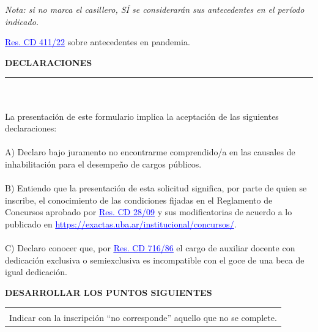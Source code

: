 \documentclass{article}
\newcommand{\titulosec}[1]{\textbf{\textsf{\MakeUppercase{#1}}}}
\newcommand{\seccion}[1]{
    \bigskip
    \noindent \titulosec{#1} \\
    \noindent\rule{\textwidth}{1pt}
  }
\newcommand{\recuadro}[1]{
    \begin{center}
    \begin{tabular}{|m{0.9\textwidth}|}
        \hline
        \begin{center}
        \textsf{\textbf{#1}}
        \end{center}
        \\
        \hline
    \end{tabular}
    \end{center}
  }
\newcommand{\enlace}[2]{\href{#1}{\textcolor{blue}{\underline{#2}}}}
\begin{document}
  \noindent \textit{Nota: si no marca el casillero, SÍ se considerarán sus antecedentes en el período indicado.}

  \noindent \enlace{https://exactas.uba.ar/wp-content/uploads/2022/04/CD-22-0411-MODIFICACION-REGLAMENTO.pdf}{Res. CD 411/22} sobre antecedentes en pandemia.

  \seccion{Declaraciones}

  \newpage

  \noindent \hrulefill
  \\\\
  \noindent La presentación de este formulario implica la aceptación de las siguientes declaraciones:
  \\\\
  \noindent A) Declaro bajo juramento no encontrarme comprendido/a en las causales de inhabilitación para el desempeño de cargos públicos.
  \\\\
  \noindent B) Entiendo que la presentación de esta solicitud significa, por parte de quien se inscribe, el conocimiento de las condiciones fijadas en el Reglamento de Concursos aprobado por \enlace{https://exactas.uba.ar/wp-content/uploads/2022/12/Res.CD-28-09-Reglamento-Concursos-Docentes-Auxiliares.pdf}{Res. CD 28/09} y sus modificatorias de acuerdo a lo publicado en \enlace{https://exactas.uba.ar/institucional/concursos/}{https://exactas.uba.ar/institucional/concursos/}.
  \\\\
  \noindent C) Declaro conocer que, por \enlace{http://exactas.uba.ar/wp-content/uploads/2017/06/res.cd_716-86_incompatibilidad_de_cargo_con_beca.pdf}{Res. CD 716/86} el cargo de auxiliar docente con dedicación exclusiva o semiexclusiva es incompatible con el goce de una beca de igual dedicación.

  \newpage

  \noindent \titulosec{Desarrollar los Puntos Siguientes}

  \recuadro{En todos los casos ordenar los antecedentes cronológicamente, poniendo primero los más recientes.\\Indicar con la inscripción “no corresponde” aquello que no se complete.}
\end{document}
